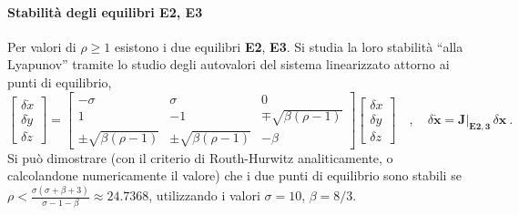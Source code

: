 \paragraph{Stabilità degli equilibri E2, E3}
Per valori di $\rho \geq 1$ esistono i due equilibri \textbf{E2}, \textbf{E3}. Si studia
 la loro stabilità ``alla Lyapunov'' tramite lo studio degli autovalori del sistema linearizzato
 attorno ai punti di equilibrio,
\begin{equation}
 \begin{bmatrix} \delta \dot{x} \\ \delta \dot{y} \\ \delta \dot{z} \end{bmatrix} = 
 \begin{bmatrix}-\sigma & \sigma & 0 \\ 1 & -1 & \mp \sqrt{\beta(\rho-1)} \\
 \pm \sqrt{\beta(\rho-1)} & \pm \sqrt{\beta(\rho-1)} & - \beta \end{bmatrix}  
 \begin{bmatrix} \delta x \\ \delta y \\ \delta z \end{bmatrix} \quad , \quad
 \delta \dot{\bm{x}} = \bm{J}|_{\bm{E2,3}} \, \delta \bm{x} \ .
\end{equation}
Si può dimostrare (con il criterio di Routh-Hurwitz analiticamente, o calcolandone numericamente
 il valore) che i due punti di equilibrio sono stabili se
 $\rho < \frac{\sigma(\sigma+\beta+3)}{\sigma-1-\beta} \approx 24.7368$, utilizzando i valori
 $\sigma = 10$, $\beta = 8/3$.

